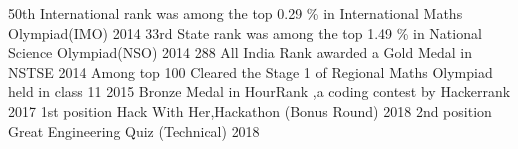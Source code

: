 \begin{cvhonors}
  \cvhonor
    {50th International rank}
    {was among the top 0.29 \% in International Maths Olympiad(IMO)}
    {}
    {2014} 
  \cvhonor
    {33rd State rank}
    {was among the top 1.49 \% in National Science Olympiad(NSO)}
    {}
    {2014}
  \cvhonor
    {288 All India Rank}
    {awarded a Gold Medal in NSTSE}
    {}
    {2014}
  \cvhonor
    {Among top 100}
    {Cleared the Stage 1 of Regional Maths Olympiad held in class 11}
    {}
    {2015}
  \cvhonor
  {Bronze Medal}
  {in HourRank ,a coding contest by Hackerrank}
  {}
  {2017}
  \cvhonor
  {1st position}
  {Hack With Her,Hackathon (Bonus Round)}
  {}
  {2018}
  \cvhonor
  {2nd position}
  {Great Engineering Quiz (Technical)}
  {}
  {2018}
\end{cvhonors}


